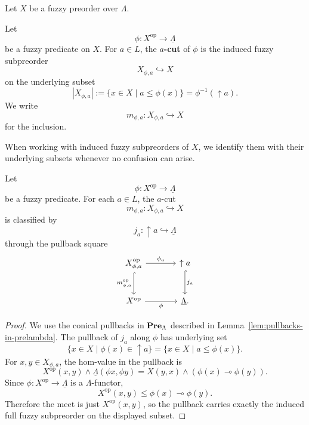 Let \(X\) be a fuzzy preorder over \(\Lambda\).

\begin{definition}
\label{def:principal-upper-sets-and-level-cuts}
    Let
    \[
        \phi:X^{\mathrm{op}}\to\underline{\Lambda}
    \]
    be a fuzzy predicate on \(X\). For \(a\in L\), the \textbf{\(a\)-cut} of \(\phi\) is the induced fuzzy subpreorder
    \[
        X_{\phi,a}\hookrightarrow X
    \]
    on the underlying subset
    \[
        |X_{\phi,a}|
        :=
        \{x\in X\mid a\leq\phi(x)\}
        =
        \phi^{-1}(\uparrow a).
    \]
    We write
    \[
        m_{\phi,a}:X_{\phi,a}\hookrightarrow X
    \]
    for the inclusion.
\end{definition}

When working with induced fuzzy subpreorders of \(X\), we identify them with their underlying subsets whenever no confusion can arise.

\begin{proposition}
\label{prop:level-cuts-as-classifier-pullbacks}
    Let
    \[
        \phi:X^{\mathrm{op}}\to\underline{\Lambda}
    \]
    be a fuzzy predicate. For each \(a\in L\), the \(a\)-cut
    \[
        m_{\phi,a}:X_{\phi,a}\hookrightarrow X
    \]
    is classified by
    \[
        j_a:\uparrow a\hookrightarrow\underline{\Lambda}
    \]
    through the pullback square
    \[
        \begin{tikzcd}[column sep=large,row sep=large]
            X_{\phi,a}^{\mathrm{op}}
            \arrow[r,"\phi_a"]
            \arrow[d,hook,"m_{\phi,a}^{\mathrm{op}}"']
            &
            \uparrow a
            \arrow[d,hook,"j_a"]
            \\
            X^{\mathrm{op}}
            \arrow[r,"\phi"']
            &
            \underline{\Lambda}.
        \end{tikzcd}
    \]
\end{proposition}

\begin{proof}
    We use the conical pullbacks in \(\mathbf{Pre}_\Lambda\) described in Lemma~\ref{lem:pullbacks-in-prelambda}. The pullback of \(j_a\) along \(\phi\) has underlying set
    \[
        \{x\in X\mid \phi(x)\in\uparrow a\}
        =
        \{x\in X\mid a\leq\phi(x)\}.
    \]
    For \(x,y\in X_{\phi,a}\), the hom-value in the pullback is
    \[
        X^{\mathrm{op}}(x,y)
        \wedge
        \underline{\Lambda}(\phi x,\phi y)
        =
        X(y,x)\wedge(\phi(x)\multimap\phi(y)).
    \]
    Since \(\phi:X^{\mathrm{op}}\to\underline{\Lambda}\) is a \(\Lambda\)-functor,
    \[
        X^{\mathrm{op}}(x,y)
        \leq
        \phi(x)\multimap\phi(y).
    \]
    Therefore the meet is just \(X^{\mathrm{op}}(x,y)\), so the pullback carries exactly the induced full fuzzy subpreorder on the displayed subset.
\end{proof}

